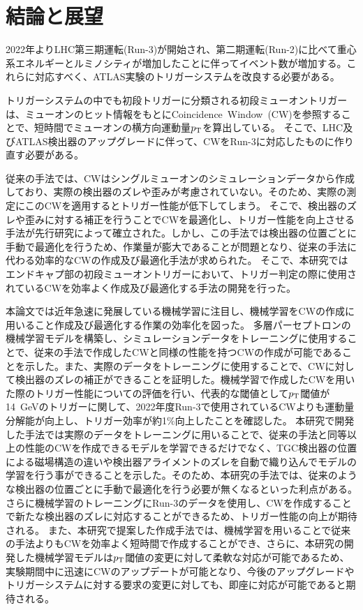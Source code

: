 \chapter{結論と展望}\label{chapter6}
2022年よりLHC第三期運転(Run-3)が開始され、第二期運転(Run-2)に比べて重心系エネルギーとルミノシティが増加したことに伴ってイベント数が増加する。これらに対応すべく、ATLAS実験のトリガーシステムを改良する必要がある。

トリガーシステムの中でも初段トリガーに分類される初段ミューオントリガーは、ミューオンのヒット情報をもとにCoincidence~Window~(CW)を参照することで、短時間でミューオンの横方向運動量$p_{\rm{T}}$を算出している。
そこで、LHC及びATLAS検出器のアップグレードに伴って、CWをRun-3に対応したものに作り直す必要がある。

従来の手法では、CWはシングルミューオンのシミュレーションデータから作成しており、実際の検出器のズレや歪みが考慮されていない。そのため、実際の測定にこのCWを適用するとトリガー性能が低下してしまう。
そこで、検出器のズレや歪みに対する補正を行うことでCWを最適化し、トリガー性能を向上させる手法が先行研究によって確立された。しかし、この手法では検出器の位置ごとに手動で最適化を行うため、作業量が膨大であることが問題となり、従来の手法に代わる効率的なCWの作成及び最適化手法が求められた。
そこで、本研究ではエンドキャプ部の初段ミューオントリガーにおいて、トリガー判定の際に使用されているCWを効率よく作成及び最適化する手法の開発を行った。

本論文では近年急速に発展している機械学習に注目し、機械学習をCWの作成に用いること作成及び最適化する作業の効率化を図った。
多層パーセプトロンの機械学習モデルを構築し、シミュレーションデータをトレーニングに使用することで、従来の手法で作成したCWと同様の性能を持つCWの作成が可能であることを示した。また、実際のデータをトレーニングに使用することで、CWに対して検出器のズレの補正ができることを証明した。機械学習で作成したCWを用いた際のトリガー性能についての評価を行い、代表的な閾値として$p_{\rm{T}}$閾値が14~GeVのトリガーに関して、2022年度Run-3で使用されているCWよりも運動量分解能が向上し、トリガー効率が約1$\%$向上したことを確認した。
本研究で開発した手法では実際のデータをトレーニングに用いることで、従来の手法と同等以上の性能のCWを作成できるモデルを学習できるだけでなく、TGC検出器の位置による磁場構造の違いや検出器アライメントのズレを自動で織り込んでモデルの学習を行う事ができることを示した。そのため、本研究の手法では、従来のような検出器の位置ごとに手動で最適化を行う必要が無くなるといった利点がある。
さらに機械学習のトレーニングにRun-3のデータを使用し、CWを作成することで新たな検出器のズレに対応することができるため、トリガー性能の向上が期待される。
また、本研究で提案した作成手法では、機械学習を用いることで従来の手法よりもCWを効率よく短時間で作成することができ、さらに、本研究の開発した機械学習モデルは$p_{\rm{T}}$閾値の変更に対して柔軟な対応が可能であるため、実験期間中に迅速にCWのアップデートが可能となり、今後のアップグレードやトリガーシステムに対する要求の変更に対しても、即座に対応が可能であると期待される。

